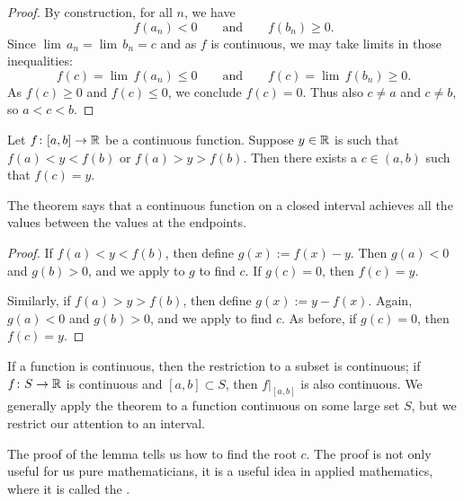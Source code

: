 \begin{proof}
By construction, for all $n$, we have
\begin{equation*}
f(a_n) < 0
\qquad \text{and} \qquad
f(b_n) \geq 0 .
\end{equation*}
Since
$\lim\, a_n = \lim\, b_n = c$
and as $f$ is continuous, we may take 
limits in those inequalities:
\begin{equation*}
f(c) = \lim\, f(a_n) \leq 0
\qquad \text{and} \qquad
f(c) = \lim\, f(b_n) \geq 0 .
\end{equation*}
As $f(c) \geq 0$ and 
$f(c) \leq 0$, we conclude $f(c) = 0$.
Thus also $c \not=a$ and $c \not= b$, so
$a < c < b$.
\end{proof}

\begin{thm} \label{IVT:thm}
Let $f \colon [a,b] \to {\mathbb{R}}$ be a continuous function.
Suppose $y \in {\mathbb{R}}$ is such that $f(a) < y < f(b)$
or $f(a) > y > f(b)$.  Then there exists a $c \in (a,b)$
such that $f(c) = y$.
\end{thm}

The theorem says that a continuous function on a closed interval
achieves all the values between the values at the endpoints.

\begin{proof}
If $f(a) < y < f(b)$, then define $g(x) := f(x)-y$.  Then 
$g(a) < 0$ and $g(b) > 0$, and we apply 
to $g$ to find $c$.  If $g(c) = 0$, then $f(c) = y$.

Similarly, if $f(a) > y > f(b)$, then define $g(x) := y-f(x)$.
Again, $g(a) < 0$ and $g(b) > 0$, and we apply  to
find $c$.
As before, if $g(c) = 0$, then $f(c) = y$.
\end{proof}

If a function is continuous, then the restriction
to a subset is continuous; if $f \colon S \to {\mathbb{R}}$ is continuous and
$[a,b] \subset S$, then $f|_{[a,b]}$ is also continuous.  We generally
apply the theorem to a function continuous on some large set $S$,
but we restrict our attention to an interval.


The proof of the lemma tells us how to find the root $c$.  The
proof is not only useful for us pure mathematicians,
it is a useful idea in applied mathematics,
where it is called the \emph{}.


